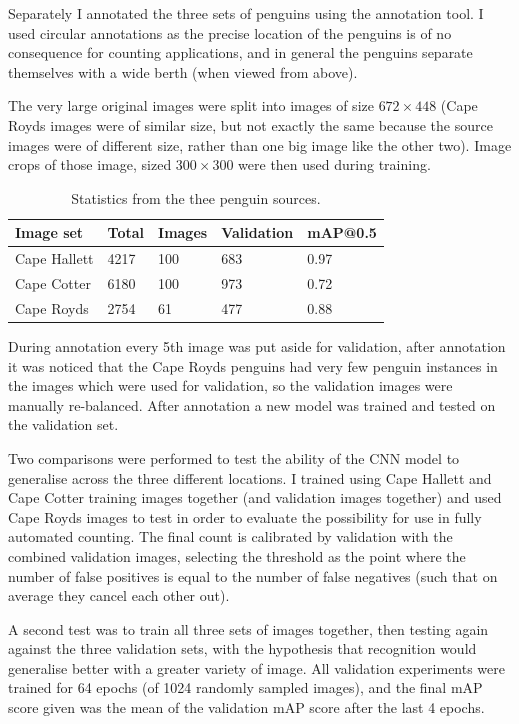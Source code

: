 Separately I annotated the three sets of penguins using the annotation tool. I used circular annotations as the precise location of the penguins is of no consequence for counting applications, and in general the penguins separate themselves with a wide berth (when viewed from above).  

The very large original images were split into images of size $ 672\times448 $ (Cape Royds images were of similar size, but not exactly the same because the source images were of different size, rather than one big image like the other two). Image crops of those image, sized $ 300\times300 $ were then used during training.

\begin{table}[ht]
  \centering
    \caption{Statistics from the thee penguin sources. }
  \begin{tabular}{ l  l  l  l  l }
    Image set & Total & Images & Validation & mAP@0.5 \\
    \toprule
    Cape Hallett  & 4217 & 100 & 683 & 0.97 \\
    Cape Cotter   & 6180 & 100 & 973 & 0.72  \\
    Cape Royds    & 2754 & 61 & 477  & 0.88 \\
    \bottomrule
  \end{tabular}
\label{fig:penguin_statistics}
\end{table}

During annotation every 5th image was put aside for validation, after annotation it was noticed that the Cape Royds penguins had very few penguin instances in the images which were used for validation, so the validation images were manually re-balanced. After annotation a new model was trained and tested on the validation set.

Two comparisons were performed to test the ability of the \gls{CNN} model to generalise across the three different locations. I trained using Cape Hallett and Cape Cotter training images together (and validation images together) and used Cape Royds images to test in order to evaluate the possibility for use in fully automated counting. The final count is calibrated by validation with the combined validation images, selecting the threshold as the point where the number of false positives is equal to the number of false negatives (such that on average they cancel each other out).

A second test was to train all three sets of images together, then testing again against the three validation sets, with the hypothesis that recognition would generalise better with a greater variety of image. All validation experiments were trained for 64 epochs (of 1024 randomly sampled images), and the final mAP score given was the mean of the validation mAP score after the last 4 epochs.




